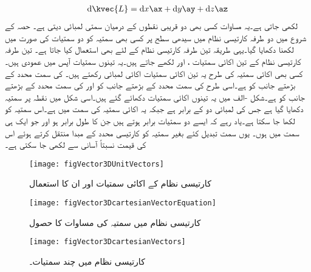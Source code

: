\begin{align}\label{مساوات_سمتیہ_کارتیسی_چھوٹا_فاصلہ}
\dif \kvec{L}=\dif x \ax+\dif y \ay+\dif z \az
\end{align}
لکھی جاتی ہے۔یہ مساوات کسی بھی دو قریبی نقطوں کے درمیان سمتی لمبائی دیتی ہے۔
حصہ   کے شروع میں دو طرفہ کارتیسی نظام  میں سیدھی سطح پر کسی بھی سمتیہ کو دو سمتیات کی صورت میں لکھنا دکھایا گیا۔یہی طریقہ تین طرفہ کارتیسی نظام کے لئے بھی استعمال کیا جاتا ہے۔ تین طرفہ کارتیسی نظام کے تین اکائی سمتیات ،  اور  لکھے جاتے ہیں۔یہ تینوں سمتیات آپس میں عمودی ہیں۔کسی بھی اکائی سمتیہ کی طرح یہ تین اکائی سمتیات اکائی لمبائی رکھتے ہیں۔  کی سمت  محدد کے بڑھتے جانب کو ہے۔اسی طرح  کی سمت  محدد کے بڑھتے جانب کو اور  کی سمت  محدد کے بڑھتے جانب کو ہے۔شکل -الف میں یہ تینوں اکائی سمتیات دکھائے گئے ہیں۔اسی شکل میں نقطہ  پر سمتیہ دکھایا گیا ہے جس کی لمبائی دو کے برابر ہے جبکہ یہ اکائی سمتیہ  کی سمت میں ہے۔اس سمتیہ کو  لکھا جا سکتا ہے۔یاد رہے کہ ایسے دو سمتیات برابر ہوتے ہیں جن کا طول برابر ہو اور جو ایک ہی سمت میں ہوں۔ یوں سمت تبدیل کئے بغیر سمتیہ کو کارتیسی محدد کے مبدا منتقل کرتے ہوئے اس کی قیمت نسبتاً آسانی سے لکھی جا سکتی ہے۔
\begin{figure}
\centering
\texttt{[image: figVector3DUnitVectors]}
\caption{کارتیسی نظام کے اکائی سمتیات اور ان کا استعمال}
\label{شکل_سمتیہ_کارتیسی_تین_اکائی_سمتیات}
\end{figure}
%
\begin{figure}
\centering
\texttt{[image: figVector3DcartesianVectorEquation]}
\caption{کارتیسی نظام میں سمتیہ کی مساوات کا حصول}
\label{شکل_سمتیہ_کارتیسی_سمتیہ_کی_مساوات}
\end{figure}
%
\begin{figure}
\centering
\texttt{[image: figVector3DcartesianVectors]}
\caption{کارتیسی نظام میں چند سمتیات۔}
\label{شکل_سمتیہ_کارتیسی_چند_سمتیات}
\end{figure}
%

